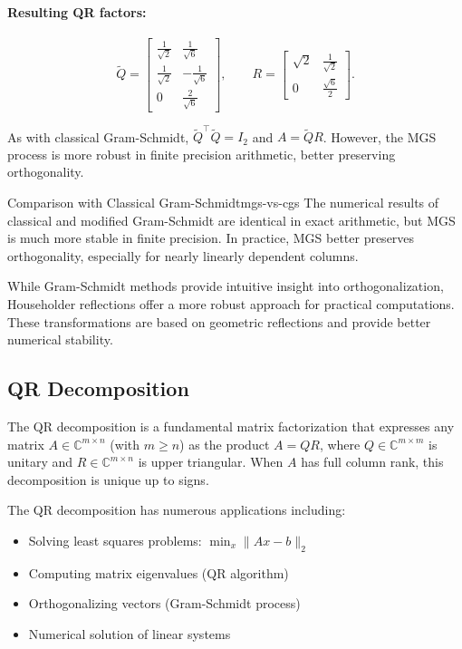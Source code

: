 \paragraph{Resulting QR factors:}
\[
    \widetilde{Q} = \begin{bmatrix}
        \frac{1}{\sqrt{2}} & \frac{1}{\sqrt{6}}  \\
        \frac{1}{\sqrt{2}} & -\frac{1}{\sqrt{6}} \\
        0                  & \frac{2}{\sqrt{6}}
    \end{bmatrix}, \qquad
    R = \begin{bmatrix}
        \sqrt{2} & \frac{1}{\sqrt{2}} \\
        0        & \frac{\sqrt{6}}{2}
    \end{bmatrix}.
\]

As with classical Gram-Schmidt, $\widetilde{Q}^\top \widetilde{Q} = I_2$ and $A = \widetilde{Q} R$. However, the MGS process is more robust in finite precision arithmetic, better preserving orthogonality.

\begin{remark}{Comparison with Classical Gram-Schmidt}{mgs-vs-cgs}
    The numerical results of classical and modified Gram-Schmidt are identical in exact arithmetic, but MGS is much more stable in finite precision. In practice, MGS better preserves orthogonality, especially for nearly linearly dependent columns.
\end{remark}

While Gram-Schmidt methods provide intuitive insight into orthogonalization, Householder reflections offer a more robust approach for practical computations.
These transformations are based on geometric reflections and provide better numerical stability.

\subsection{QR Decomposition}
The QR decomposition is a fundamental matrix factorization that expresses any matrix $A \in \mathbb{C}^{m \times n}$ (with $m \geq n$) as the product $A = QR$, where $Q \in \mathbb{C}^{m \times m}$ is unitary and $R \in \mathbb{C}^{m \times n}$ is upper triangular. When $A$ has full column rank, this decomposition is unique up to signs.

The QR decomposition has numerous applications including:
\begin{itemize}
    \item Solving least squares problems: $\min_x \|Ax - b\|_2$
    \item Computing matrix eigenvalues (QR algorithm)
    \item Orthogonalizing vectors (Gram-Schmidt process)
    \item Numerical solution of linear systems
\end{itemize}

